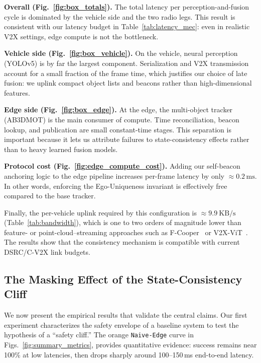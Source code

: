 \textbf{Overall (Fig.~\ref{fig:box_totals}).}
The total latency per perception-and-fusion cycle is dominated by the vehicle side and the two radio legs.
This result is consistent with our latency budget in Table~\ref{tab:latency_mec}: even in realistic V2X settings, edge compute is not the bottleneck.

\textbf{Vehicle side (Fig.~\ref{fig:box_vehicle}).}
On the vehicle, neural perception (YOLOv5) is by far the largest component.
Serialization and V2X transmission account for a small fraction of the frame time, which justifies our choice of late fusion: we uplink compact object lists and beacons rather than high-dimensional features.

\textbf{Edge side (Fig.~\ref{fig:box_edge}).}
At the edge, the multi-object tracker (AB3DMOT) is the main consumer of compute.
Time reconciliation, beacon lookup, and publication are small constant-time stages.
This separation is important because it lets us attribute failures to state-consistency effects rather than to heavy learned fusion models.

\textbf{Protocol cost (Fig.~\ref{fig:edge_compute_cost}).}
Adding our self-beacon anchoring logic to the edge pipeline increases per-frame latency by only \(\approx 0.2\,\mathrm{ms}\).
In other words, enforcing the Ego-Uniqueness invariant is effectively free compared to the base tracker.

Finally, the per-vehicle uplink required by this configuration is \(\approx 9.9~\mathrm{KB/s}\) (Table~\ref{tab:bandwidth}), which is one to two orders of magnitude lower than feature- or point-cloud–streaming approaches such as F-Cooper~\cite{fcooper} or V2X-ViT~\cite{v2xvit2022}. The results show that the consistency mechanism is compatible with current DSRC/C-V2X link budgets.


\subsection{The Masking Effect of the State-Consistency Cliff}
\label{sec:masking_effect}

We now present the empirical results that validate the central claims. Our first experiment characterizes the safety envelope of a baseline system to test the hypothesis of a ``safety cliff.'' The orange \texttt{Naive-Edge} curve in Figs.~\ref{fig:summary_metrics}, provides quantitative evidence: success remains near 100\% at low latencies, then drops sharply around 100--150\,ms end-to-end latency.

